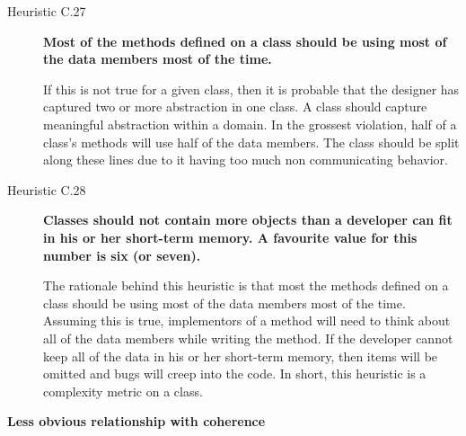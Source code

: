 \begin{description}
\item[Heuristic C.27] \textbf{Most of the methods defined on a class should be using most of the data members most of the time.}

If this is not true for a given class, then it is probable that the designer has captured two or more abstraction in one class. A class should capture meaningful abstraction within a domain. In the grossest violation, half of a class's methods will use half of the data members. The class should be split along these lines due to it having too much non communicating behavior. 

\item[Heuristic C.28] \textbf{Classes should not contain more objects than a developer can fit in his or her short-term memory. A favourite value for this number is six (or seven).}

The rationale behind this heuristic is that most the methods defined on a class should be using most of the data members most of the time. Assuming this is true, implementors of a method will need to think about all of the data members while writing the method. If the developer cannot keep all of the data in his or her short-term memory, then items will be omitted and bugs will creep into the code. In short, this heuristic is a complexity metric on a class.
\end{description}

\textbf{Less obvious relationship with coherence}

